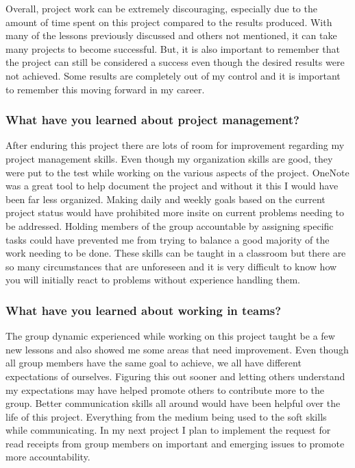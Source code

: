 Overall, project work can be extremely discouraging, especially due to the amount of 
time spent on this project compared to the results produced. With many of the lessons 
previously discussed and others not mentioned, it can take many projects to become 
successful. But, it is also important to remember that the project can still be considered 
a success even though the desired results were not achieved. Some results are completely 
out of my control and it is important to remember this moving forward in my career. \\

\subsubsection{What have you learned about project management?}

After enduring this project there are lots of room for improvement regarding my project 
management skills. Even though my organization skills are good, they were put to the test 
while working on the various aspects of the project. OneNote was a great tool to help 
document the project and without it this I would have been far less organized. 
Making daily and weekly goals based on the current project status would have prohibited 
more insite on current problems needing to be addressed. Holding members of the group 
accountable by assigning specific tasks could have prevented me from trying to balance 
a good majority of the work needing to be done. These skills can be taught in a 
classroom but there are so many circumstances that are unforeseen and it is very 
difficult to know how you will initially react to problems without experience handling 
them.   \\

\subsubsection{What have you learned about working in teams?}

The group dynamic experienced while working on this project taught be a few new lessons 
and also showed me some areas that need improvement. Even though all group members have 
the same goal to achieve, we all have different expectations of ourselves. Figuring this 
out sooner and letting others understand my expectations may have helped promote others 
to contribute more to the group. Better communication skills all around would have been 
helpful over the life of this project. Everything from the medium being used to the 
soft skills while communicating. In my next project I plan to implement the request for 
read receipts from group members on important and emerging issues to promote more 
accountability.  \\

